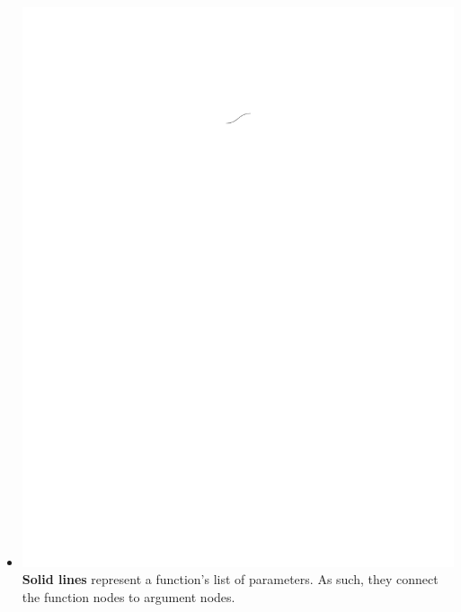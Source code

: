 \documentclass[conference]{IEEEtran}
\begin{document}
\begin{itemize}
		\item  \vspace{.25cm} \includegraphics{glossary-solidline} \textbf{Solid
			lines} represent a function's list of parameters. As such, they connect the
		function nodes to argument nodes.
		

\end{itemize}
\end{document}
